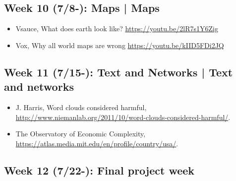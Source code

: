 \documentclass[11pt,article,oneside]{memoir} %
\begin{document}
\subsection{Week 10 (7/8-): Maps | Maps }%

\begin{itemize}\itemsep0em 
\item Vsauce, What does earth look like? \url{https://youtu.be/2lR7s1Y6Zig}
\item Vox, Why all world maps are wrong \url{https://youtu.be/kIID5FDi2JQ}
\end{itemize}	
\subsection{Week 11 (7/15-): Text and Networks | Text and networks} %

\begin{itemize}\itemsep0em 
\item J. Harris, Word clouds considered harmful, \url{http://www.niemanlab.org/2011/10/word-clouds-considered-harmful/}. 
\item The Observatory of Economic Complexity, \url{https://atlas.media.mit.edu/en/profile/country/usa/}.
\end{itemize}	
\subsection{Week 12 (7/22-): Final project week}%
\end{document}
